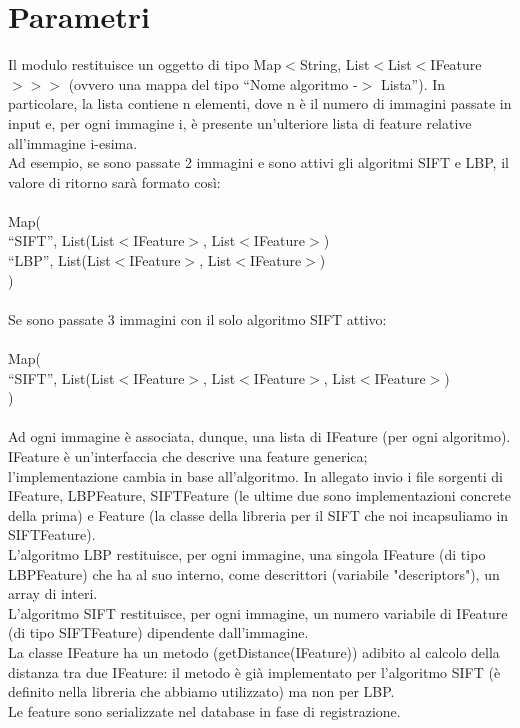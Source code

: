 \chapter{Parametri}
Il modulo restituisce un oggetto di tipo Map$<$String, List$<$List$<$IFeature$>>>$ (ovvero una mappa del tipo ``Nome algoritmo -$>$ Lista''). In particolare, la lista contiene n elementi, dove n è il numero di immagini passate in input e, per ogni immagine i, è presente un'ulteriore lista di feature relative all'immagine i-esima.\\
Ad esempio, se sono passate 2 immagini e sono attivi gli algoritmi SIFT e LBP, il valore di ritorno sarà formato così:\\\\
Map(\\
``SIFT'',  List(List$<$IFeature$>$, List$<$IFeature$>$)\\
``LBP'',   List(List$<$IFeature$>$, List$<$IFeature$>$)\\
)\\\\
Se sono passate 3 immagini con il solo algoritmo SIFT attivo:\\\\
Map(\\
``SIFT'',  List(List$<$IFeature$>$, List$<$IFeature$>$, List$<$IFeature$>$)\\
)\\\\
Ad ogni immagine è associata, dunque, una lista di IFeature (per ogni algoritmo). IFeature è un'interfaccia che descrive una feature generica;\\ l'implementazione cambia in base all'algoritmo. In allegato invio i file sorgenti di IFeature, LBPFeature, SIFTFeature (le ultime due sono implementazioni concrete della prima) e Feature (la classe della libreria per il SIFT che noi incapsuliamo in SIFTFeature).\\
L'algoritmo LBP restituisce, per ogni immagine, una singola IFeature (di tipo LBPFeature) che ha al suo interno, come descrittori (variabile "descriptors"), un array di interi.\\
L'algoritmo SIFT restituisce, per ogni immagine, un numero variabile di IFeature (di tipo SIFTFeature) dipendente dall'immagine.\\
La classe IFeature ha un metodo (getDistance(IFeature)) adibito al calcolo della distanza tra due IFeature: il metodo è già implementato per l'algoritmo SIFT (è definito nella libreria che abbiamo utilizzato) ma non per LBP.\\
Le feature sono serializzate nel database in fase di registrazione.\\